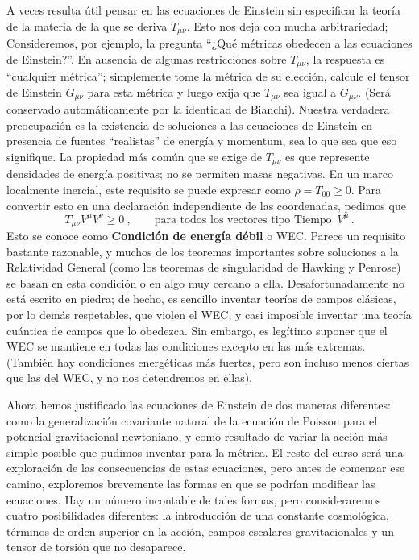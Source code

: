 \documentclass[11pt,b5paper,openany,twoside]{book}
\newcommand{\mn}{{\mu\nu}}
\begin{document}
A veces resulta útil pensar en las ecuaciones de Einstein sin especificar la teoría de la materia de la que se deriva $T_\mn$.
Esto nos deja con mucha arbitrariedad; Consideremos, por ejemplo, la pregunta ``¿Qué métricas obedecen a las ecuaciones de Einstein?''. En ausencia de algunas restricciones sobre $T_\mn$, la respuesta es ``cualquier métrica''; simplemente tome la métrica de su elección, calcule el tensor de Einstein $G_\mn$ para esta métrica y luego exija que $T_\mn$ sea igual a $G_\mn$.
(Será conservado automáticamente por la identidad de Bianchi).
Nuestra verdadera preocupación es la existencia de soluciones a las ecuaciones de Einstein en presencia de fuentes ``realistas'' de energía y momentum, sea lo que sea que eso signifique.
La propiedad más común que se exige de $T_\mn$ es que represente densidades de energía positivas; no se permiten masas negativas.
En un marco localmente inercial, este requisito se puede expresar como $\rho = T_{00} \geq 0$.
Para convertir esto en una declaración independiente de las coordenadas, pedimos que
\begin{equation}
T_\mn V^\mu V^\nu \geq 0\ ,\qquad\text{para todos los vectores tipo Tiempo }\, V^\mu\,.\label{4.72}
\end{equation}
Esto se conoce como {\bf Condición de energía débil} o WEC.
Parece un requisito bastante razonable, y muchos de los teoremas importantes sobre soluciones a la Relatividad General (como los teoremas de singularidad de Hawking y Penrose) se basan en esta condición o en algo muy cercano a ella.
Desafortunadamente no está escrito en piedra; de hecho, es sencillo inventar teorías de campos clásicas, por lo demás respetables, que violen el WEC, y casi imposible inventar una teoría cuántica de campos que lo obedezca.
Sin embargo, es legítimo suponer que el WEC se mantiene en todas las condiciones excepto en las más extremas.
(También hay condiciones energéticas más fuertes, pero son incluso menos ciertas que las del WEC, y no nos detendremos en ellas).

Ahora hemos justificado las ecuaciones de Einstein de dos maneras diferentes: como la generalización covariante natural de la ecuación de Poisson para el potencial gravitacional newtoniano, y como resultado de variar la acción más simple posible que pudimos inventar para la métrica.
El resto del curso será una exploración de las consecuencias de estas ecuaciones, pero antes de comenzar ese camino, exploremos brevemente las formas en que se podrían modificar las ecuaciones.
Hay un número incontable de tales formas, pero consideraremos cuatro posibilidades diferentes: la introducción de una constante cosmológica, términos de orden superior en la acción, campos escalares gravitacionales y un tensor de torsión que no desaparece.
\end{document}
